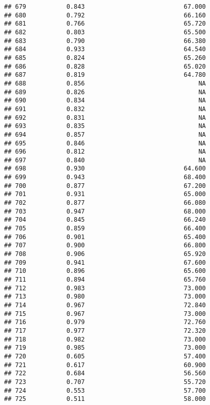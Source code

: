 \documentclass[
]{article}
\begin{document}
\begin{verbatim}
## 679           0.843                           67.000
## 680           0.792                           66.160
## 681           0.766                           65.720
## 682           0.803                           65.500
## 683           0.790                           66.380
## 684           0.933                           64.540
## 685           0.824                           65.260
## 686           0.828                           65.020
## 687           0.819                           64.780
## 688           0.856                               NA
## 689           0.826                               NA
## 690           0.834                               NA
## 691           0.832                               NA
## 692           0.831                               NA
## 693           0.835                               NA
## 694           0.857                               NA
## 695           0.846                               NA
## 696           0.812                               NA
## 697           0.840                               NA
## 698           0.930                           64.600
## 699           0.943                           68.400
## 700           0.877                           67.200
## 701           0.931                           65.000
## 702           0.877                           66.080
## 703           0.947                           68.000
## 704           0.845                           66.240
## 705           0.859                           66.400
## 706           0.901                           65.400
## 707           0.900                           66.800
## 708           0.906                           65.920
## 709           0.941                           67.600
## 710           0.896                           65.600
## 711           0.894                           65.760
## 712           0.983                           73.000
## 713           0.980                           73.000
## 714           0.967                           72.840
## 715           0.967                           73.000
## 716           0.979                           72.760
## 717           0.977                           72.320
## 718           0.982                           73.000
## 719           0.985                           73.000
## 720           0.605                           57.400
## 721           0.617                           60.900
## 722           0.684                           56.560
## 723           0.707                           55.720
## 724           0.553                           57.700
## 725           0.511                           58.000

\end{verbatim}
\end{document}
